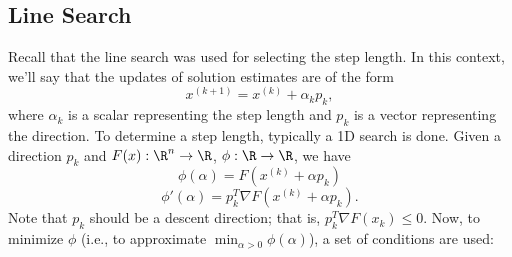\documentclass[letterpaper]{article}
\begin{document}
\subsection{Line Search}
Recall that the line search was used for selecting the step length. In this context, we'll say that the updates of solution estimates are of the form 
\[x^{(k + 1)} = x^{(k)} + \alpha_{k} p_{k},\]
where $\alpha_{k}$ is a scalar representing the step length and $p_{k}$ is a vector representing the direction. To determine a step length, typically a 1D search is done. Given a direction $p_k$ and $F(x): \R^n \to \R$, $\phi: \R \to \R$, we have 
\[\phi(\alpha) = F(x^{(k)} + \alpha p_k)\]
\[\phi'(\alpha) = p_{k}^T \nabla F(x^{(k)} + \alpha p_k).\]
Note that $p_k$ should be a descent direction; that is, $p_k^T \nabla F(x_k) \leq 0$. Now, to minimize $\phi$ (i.e., to approximate $\min_{\alpha > 0} \phi(\alpha)$), a set of conditions are used: 
\end{document}
